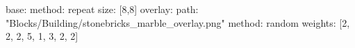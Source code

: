 base:
  method: repeat
  size: [8,8]
overlay:
  path: "Blocks/Building/stonebricks_marble_overlay.png"
  method: random
  weights: [2, 2, 2, 5, 1, 3, 2, 2]